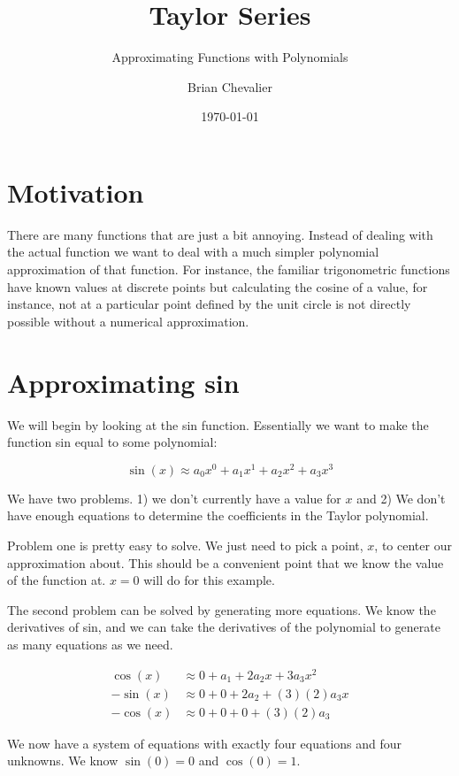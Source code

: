 \documentclass{../../KDHnotes}
\title{Taylor Series}
\subtitle{Approximating Functions with Polynomials}
\author{Brian Chevalier}
\date{\today}
\begin{document}
\maketitle
\section{Motivation}

There are many functions that are just a bit annoying. Instead of dealing with the actual function we want to deal with a much simpler polynomial approximation of that function. For instance, the familiar trigonometric functions have known values at discrete points but calculating the cosine of a value, for instance, not at a particular point defined by the unit circle is not directly possible without a numerical approximation. 

\section{Approximating sin}
We will begin by looking at the sin function. Essentially we want to make the function sin equal to some polynomial:

\begin{equation}
  \sin(x)\approx a_0 x^0 + a_1x^1+a_2x^2 + a_3x^3
  \label{Eq:sin}
\end{equation}

We have two problems. 1) we don't currently have a value for $x$ and 2) We don't have enough equations to determine the coefficients in the Taylor polynomial.

Problem one is pretty easy to solve. We just need to pick a point, $x$, to center our approximation about. This should be a convenient point that we know the value of the function at. $x=0$ will do for this example.

The second problem can be solved by generating more equations. We know the derivatives of sin, and we can take the derivatives of the polynomial to generate as many equations as we need.

\begin{align}
  \cos(x)  &\approx 0   +a_1  +2a_2x  +3a_3x^2\\
  -\sin(x) &\approx 0   +0    +2a_2   +(3)(2)a_3x\\
  -\cos(x) &\approx 0   +0    +0      +(3)(2)a_3
\end{align}

We now have a system of equations with exactly four equations and four unknowns. We know $\sin(0)=0$ and $\cos(0)=1$.
\end{document}

